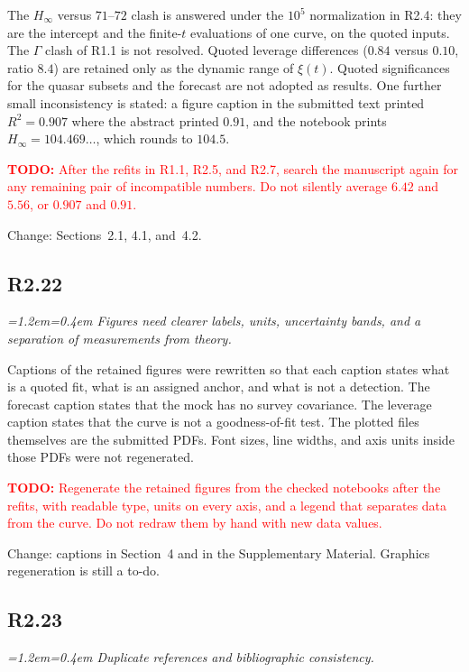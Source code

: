\documentclass[11pt,a4paper]{article}
\newenvironment{review}{\par\color{revcolor}\itshape\leftskip=1.2em\rightskip=0.4em\noindent}{\par\leftskip=0pt\rightskip=0pt}
\newcommand{\revtodo}[1]{\textcolor{red}{\textbf{TODO:} #1}}
\begin{document}
The $H_\infty$ versus $71$--$72$ clash is answered under the $10^{5}$ normalization in R2.4: they are the intercept and the finite-$t$ evaluations of one curve, on the quoted inputs.
The $\Gamma$ clash of R1.1 is not resolved.
Quoted leverage differences ($0.84$ versus $0.10$, ratio $8.4$) are retained only as the dynamic range of $\xi(t)$.
Quoted significances for the quasar subsets and the forecast are not adopted as results.
One further small inconsistency is stated: a figure caption in the submitted text printed $R^2 = 0.907$ where the abstract printed $0.91$, and the notebook prints $H_\infty = 104.469\ldots$, which rounds to $104.5$.

\revtodo{After the refits in R1.1, R2.5, and R2.7, search the manuscript again for any remaining pair of incompatible numbers. Do not silently average $6.42$ and $5.56$, or $0.907$ and $0.91$.}

Change: Sections~2.1, 4.1, and~4.2.

\subsection*{R2.22}
\begin{review}
Figures need clearer labels, units, uncertainty bands, and a separation of measurements from theory.
\end{review}

Captions of the retained figures were rewritten so that each caption states what is a quoted fit, what is an assigned anchor, and what is not a detection.
The forecast caption states that the mock has no survey covariance.
The leverage caption states that the curve is not a goodness-of-fit test.
The plotted files themselves are the submitted PDFs.
Font sizes, line widths, and axis units inside those PDFs were not regenerated.

\revtodo{Regenerate the retained figures from the checked notebooks after the refits, with readable type, units on every axis, and a legend that separates data from the curve. Do not redraw them by hand with new data values.}

Change: captions in Section~4 and in the Supplementary Material. Graphics regeneration is still a to-do.

\subsection*{R2.23}
\begin{review}
Duplicate references and bibliographic consistency.
\end{review}
\end{document}
